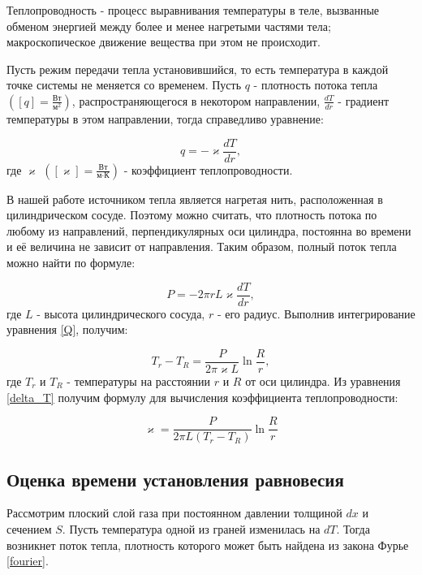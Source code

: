\documentclass[15pt,a5paper,reqno]{article}
\renewcommand{\kappa}{\varkappa}
\begin{document}
    Теплопроводность - процесс выравнивания температуры в теле, вызванные обменом энергией между более и менее нагретыми частями тела; макроскопическое движение вещества при этом не происходит.
    
    Пусть режим передачи тепла установившийся, то есть температура в каждой точке системы не меняется со временем. Пусть $q$ - плотность потока тепла $\left([q] = \frac{\text{Вт}}{\text{м}^2}\right)$, распространяющегося в некотором направлении, $\frac{dT}{dr}$ - градиент температуры в этом направлении, тогда справедливо уравнение:
    
    \begin{equation}\label{fourier}
        q = -\kappa\frac{dT}{dr},
    \end{equation}
    где $\kappa$ $\left([\kappa] = \frac{\text{Вт}}{\text{м}\cdot\text{К}}\right)$ - коэффициент теплопроводности.
    
    В нашей работе источником тепла является нагретая нить, расположенная в цилиндрическом сосуде. Поэтому можно считать, что плотность потока по любому из направлений, перпендикулярных оси цилиндра, постоянна во времени и её величина не зависит от направления. Таким образом, полный поток тепла можно найти по формуле:
    
    \begin{equation}\label{Q}
        P = -2\pi rL\kappa\frac{dT}{dr},
    \end{equation}
    где $L$ - высота цилиндрического сосуда, $r$ - его радиус. Выполнив интегрирование уравнения \eqref{Q}, получим:
    
    \begin{equation}\label{delta_T}
        T_r - T_R = \frac{P}{2\pi\kappa L}\ln{\frac{R}{r}},
    \end{equation}
    где $T_r$ и $T_R$ - температуры на расстоянии $r$ и $R$ от оси цилиндра. Из уравнения \eqref{delta_T} получим формулу для вычисления коэффициента теплопроводности:
    
    \begin{equation}\label{main}
        \kappa = \frac{P}{2\pi L(T_r - T_R)}\ln{\frac{R}{r}}
    \end{equation}
    
    \subsection{Оценка времени установления равновесия}
    
    Рассмотрим плоский слой газа при постоянном давлении толщиной $dx$ и сечением $S$. Пусть температура одной из граней изменилась на $dT$. Тогда возникнет поток тепла, плотность которого может быть найдена из закона Фурье \eqref{fourier}. 
    
\end{document}
